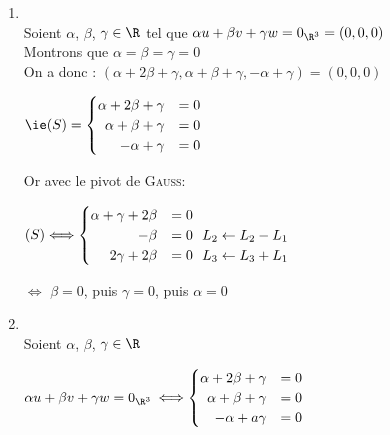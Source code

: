 \documentclass[12pt, a4paper]{report}
\begin{document}
\begin{exemple}[Exemples]
\begin{enumerate}
    \item {}
    \\
    Soient $\alpha$, $\beta$, $\gamma \in \R$ tel que $\alpha u + \beta v + \gamma w = 0_{\R^3} = (0,0,0)$\\
    Montrons que $\alpha = \beta = \gamma = 0$\\
    On a donc : $(\alpha + 2 \beta + \gamma ,  \alpha + \beta + \gamma , -\alpha + \gamma) = (0,0,0)$
    \begin{center}
    $\ie (S) =
    \begin{cases}
    \hfill \alpha + 2\beta + \gamma &=0\\
    \hfill \alpha + \beta + \gamma &=0 \\
    \hfill -\alpha + \gamma &=0
    \end{cases}
    $
    \end{center}
    Or avec le pivot de \textsc{Gauss}:
    \begin{center}
    $(S) \Longleftrightarrow
    \begin{cases}
    \hfill \alpha + \gamma + 2\beta  &=0\\
    \hfill  - \beta  &=0 \: \: \: L_2 \leftarrow L_2 - L_1\\
    \hfill 2\gamma + 2\beta &=0 \: \: \: L_3 \leftarrow L_3 + L_1
    \end{cases}
    $
    \end{center}
    $\Longleftrightarrow$ $\beta = 0$, puis $\gamma = 0$, puis $\alpha = 0$
    \\
    \item {}
    \\
    Soient $\alpha$, $\beta$, $\gamma \in \R$ 
    \begin{center}
     $\alpha u + \beta v + \gamma w = 0_{\R^3}$ $\Longleftrightarrow
    \begin{cases}
    \hfill \alpha + 2\beta + \gamma   &=0\\
    \hfill \alpha + \beta + \gamma   &=0\\
    \hfill -\alpha + a\gamma   &=0
    \end{cases}
    $
    \end{center}
    

\end{enumerate}
\end{exemple}
\end{document}
